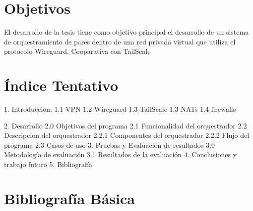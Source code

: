 \documentclass{article}
\begin{document}
\section{Objetivos}

El desarrollo de la tesis tiene como objetivo principal el desarrollo de un sistema de orquestramiento de pares dentro de una red privada virtual que utiliza el protocolo Wireguard.
Cooparativa con TailScale

\section{Índice Tentativo}

1. Introduccion:
    1.1 VPN
    1.2 Wireguard
    1.3 TailScale
    1.3 NATs
    1.4 firewalls

2. Desarrollo
    2.0 Objetivos del programa
    2.1 Funcionalidad del orquestrador
    2.2 Descripcion del orquestrador
    2.2.1 Componentes del orquestrador
    2.2.2 Flujo del programa
    2.3 Casos de uso
3. Pruebas y Evaluación de resultados 
    3.0 Metodología de evaluación
    3.1 Resultados de la evaluación
4. Conclusiones y trabajo futuro 
5. Bibliografía 

\section{Bibliografía Básica}
\end{document}
